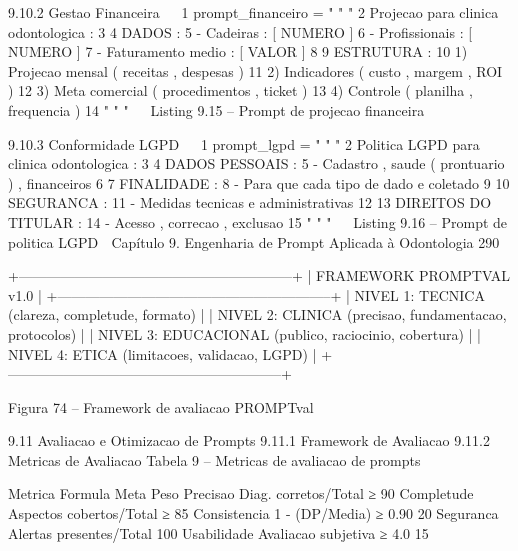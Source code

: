   9.10.2     Gestao Financeira
                                                                             
 1 prompt_financeiro = " " "
 2 Projecao para clinica odontologica :
 3
 4 DADOS :
 5 - Cadeiras : [ NUMERO ]
 6 - Profissionais : [ NUMERO ]
 7 - Faturamento medio : [ VALOR ]
 8
 9 ESTRUTURA :
10 1) Projecao mensal ( receitas , despesas )
11 2) Indicadores ( custo , margem , ROI )
12 3) Meta comercial ( procedimentos , ticket )
13 4) Controle ( planilha , frequencia )
14 " " "
                                                                             
                         Listing 9.15 – Prompt de projecao financeira


  9.10.3     Conformidade LGPD
                                                                             
 1 prompt_lgpd = " " "
 2 Politica LGPD para clinica odontologica :
 3
 4 DADOS PESSOAIS :
 5 - Cadastro , saude ( prontuario ) , financeiros
 6
 7 FINALIDADE :
 8 - Para que cada tipo de dado e coletado
 9
10 SEGURANCA :
11 - Medidas tecnicas e administrativas
12
13 DIREITOS DO TITULAR :
14 - Acesso , correcao , exclusao
15 " " "
                                                                             
                            Listing 9.16 – Prompt de politica LGPD
     Capítulo 9. Engenharia de Prompt Aplicada à Odontologia                     290


     +-----------------------------------------------------------+
     |         FRAMEWORK PROMPTVAL v1.0                          |
     +-----------------------------------------------------------+
     | NIVEL 1: TECNICA (clareza, completude, formato)          |
     | NIVEL 2: CLINICA (precisao, fundamentacao, protocolos) |
     | NIVEL 3: EDUCACIONAL (publico, raciocinio, cobertura) |
     | NIVEL 4: ETICA (limitacoes, validacao, LGPD)             |
     +-----------------------------------------------------------+

                         Figura 74 – Framework de avaliacao PROMPTval


     9.11       Avaliacao e Otimizacao de Prompts
     9.11.1      Framework de Avaliacao
     9.11.2      Metricas de Avaliacao
                           Tabela 9 – Metricas de avaliacao de prompts

                        Metrica        Formula                   Meta     Peso
                        Precisao       Diag. corretos/Total      ≥ 90%
                        Completude     Aspectos cobertos/Total   ≥ 85%
                        Consistencia   1 - (DP/Media)            ≥ 0.90   20%
                        Seguranca      Alertas presentes/Total   100%
                        Usabilidade    Avaliacao subjetiva       ≥ 4.0    15%



